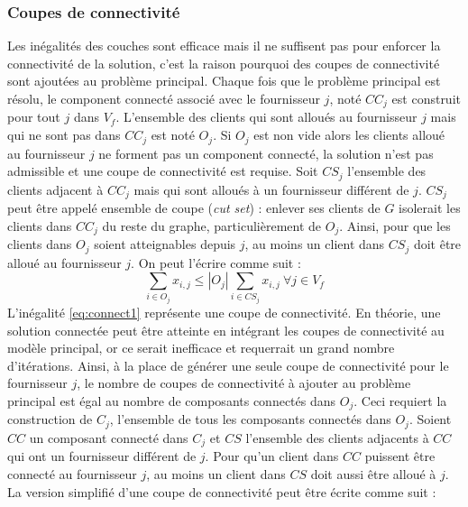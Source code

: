 \documentclass[12pt,a4paper]{article}
\begin{document}
\begin{multicols}{2}
\subsubsection*{Coupes de connectivité}
Les inégalités des couches sont efficace mais il ne suffisent pas pour enforcer la connectivité de la solution, c'est la raison pourquoi des coupes de connectivité sont ajoutées au problème principal. \newline \indent
Chaque fois que le problème principal est résolu, le component connecté associé avec le fournisseur $j$, noté $CC_{j}$ est construit pour tout $j$ dans $V_{f}$. L'ensemble des clients qui sont alloués au fournisseur $j$ mais qui ne sont pas dans $CC_{j}$ est noté $O_{j}$.\newline \indent
Si $O_{j}$ est non vide alors les clients alloué au fournisseur $j$ ne forment pas un component connecté, la solution n'est pas admissible et une coupe de connectivité est requise. Soit $CS_{j}$ l'ensemble des clients adjacent à $CC_{j}$ mais qui sont alloués à un fournisseur différent de $j$. $CS_{j}$ peut être appelé ensemble de coupe (\textit{cut set}) : enlever ses clients de $G$ isolerait les clients dans $CC_{j}$ du reste du graphe, particulièrement de $O_{j}$. Ainsi, pour que les clients dans $O_{j}$ soient atteignables depuis $j$, au moins un client dans $CS_{j}$ doit être alloué au fournisseur $j$. On peut l'écrire comme suit : 
\begin{equation}\label{eq:connect1}
\sum_{i \in O_{j}}{x_{i,j}} \leq |O_{j}|\sum_{i \in CS_{j}}{x_{i,j}} \ \forall j \in V_{f}
\end{equation}
L'inégalité \eqref{eq:connect1} représente une coupe de connectivité. En théorie, une solution connectée peut être atteinte en intégrant les coupes de connectivité au modèle principal, or ce serait inefficace et requerrait un grand nombre d'itérations. Ainsi, à la place de générer une seule coupe de connectivité pour le fournisseur $j$, le nombre de coupes de connectivité à ajouter au problème principal est égal au nombre de composants connectés dans $O_{j}$. Ceci requiert la construction de $C_{j}$, l'ensemble de tous les composants connectés dans $O_{j}$. Soient $CC$ un composant connecté dans $C_{j}$ et $CS$ l'ensemble des clients adjacents à $CC$  qui ont un fournisseur différent de $j$. Pour qu'un client dans $CC$ puissent être connecté au fournisseur $j$, au moins un client dans $CS$ doit aussi être alloué à $j$. La version simplifié d'une coupe de connectivité peut être écrite comme suit :
\begin{align*}

\end{align*}
\end{multicols}
\end{document}
